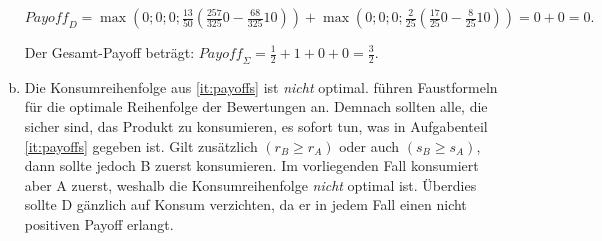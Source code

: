 \documentclass[fleqn]{article}
\begin{document}
\begin{enumerate}[a)]
  ${Payoff}_{D} =\max \left(0; 0; 0; \frac{13}{50} \left(\frac{257}{325}  0-\frac{68}{325}  10\right)\right)+\max \left(0; 0; 0; \frac{2}{25} \left(\frac{17}{25} 0-\frac{8}{25} 10\right)\right) = 0+0=0.$

  Der Gesamt-Payoff beträgt:
  ${Payoff}_{\Sigma}=\frac{1}{2}+1+0+0 = \frac{3}{2}$.
  

 



	\item Die Konsumreihenfolge aus \ref{it:payoffs} ist \textit{nicht} optimal. \textcite[S.~572]{avery_market_1999} führen Faustformeln für die optimale  Reihenfolge der Bewertungen an. Demnach sollten alle, die sicher sind, das Produkt zu konsumieren, es sofort tun, was in Aufgabenteil \ref{it:payoffs} gegeben ist. Gilt zusätzlich $\left(r_{B} \geq r_{A}\right)$ oder auch $\left(s_{B} \geq s_{A}\right)$, dann sollte jedoch B zuerst konsumieren. Im vorliegenden Fall konsumiert aber A zuerst, weshalb die Konsumreihenfolge \textit{nicht} optimal ist. Überdies sollte D gänzlich auf Konsum verzichten, da er in jedem Fall einen nicht positiven Payoff erlangt. 
	
\end{enumerate}
 \printbibliography
\end{document}
